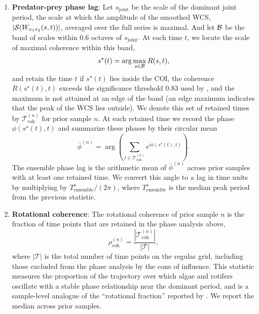\begin{enumerate}
    \item \textbf{Predator-prey phase lag}: 
    Let $s_{\mathrm{joint}}$ be the scale of the dominant joint period, the scale at which the amplitude of the smoothed WCS, $|\mathcal{S}(W_{x_1 x_2}(s, t))|$, averaged over the full series is maximal. 
    And let $\mathcal{B}$ be the band of scales within $0.6$ octaves of $s_{\mathrm{joint}}$. 
    At each time $t$, we locate the scale of maximal coherence within this band,
    \begin{equation*}
        s^\star(t) = \arg\max_{s \in \mathcal{B}} R(s, t),
    \end{equation*}
    and retain the time $t$ if $s^\star(t)$ lies inside the COI, the coherence $R(s^\star(t), t)$ exceeds the significance threshold $0.83$ used by \citet{blasius2020long}, and the maximum is not attained at an edge of the band (an edge maximum indicates that the peak of the WCS lies outside).
    We denote this set of retained times by $\mathcal{T}^{(n)}_{\mathrm{coh}}$ for prior sample $n$.
    At each retained time we record the phase $\phi(s^\star(t), t)$ and summarize these phases by their circular mean
    \begin{equation*}
    \bar{\phi}^{(n)} = \arg\left( \sum_{t \in \mathcal{T}^{(n)}_{\mathrm{coh}}} e^{i \phi(s^\star(t), t)} \right).
    \end{equation*}
    The ensemble phase lag is the arithmetic mean of $\bar{\phi}^{(n)}$ across prior samples with at least one retained time. 
    We convert this angle to a lag in time units by multiplying by $T^\star_{\mathrm{ensemble}} / (2\pi)$, where $T^\star_{\mathrm{ensemble}}$ is the median peak period from the previous statistic.
    \item \textbf{Rotational coherence}: 
    The rotational coherence of prior sample $n$ is the fraction of time points that are retained in the phase analysis above,
    \begin{equation*}
        \rho^{(n)}_{\mathrm{coh}} = \frac{|\mathcal{T}^{(n)}_{\mathrm{coh}}|}{|\mathcal{T}|},
    \end{equation*}
    where $|\mathcal{T}|$ is the total number of time points on the regular grid, including those excluded from the phase analysis by the cone of influence.    
    This statistic measures the proportion of the trajectory over which algae and rotifers oscillate with a stable phase relationship near the dominant period, and is a sample-level analogue of the ``rotational fraction'' reported by \citet{blasius2020long}. 
    We report the median across prior samples.
    \end{enumerate}

